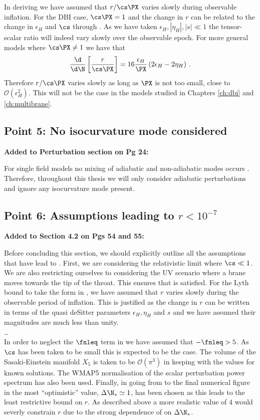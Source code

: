 In deriving  we have assumed that $r/\cs \PX$ varies slowly during
observable inflation. For the DBI case, $\cs \PX = 1$ and the change in $r$ can be related to the
change in $\epsilon_H$ and $\cs$ through . As we have taken $\epsilon_H,
|\eta_H|,|s|\ll 1$ the tensor-scalar ratio will indeed vary slowly over the observable epoch.
% 
For more general models where $\cs \PX \ne 1$ we have that
% 
\begin{equation}
 \frac{\d }{\d \N}\left[ \frac{r}{\cs \PX}\right] = 16\frac{\epsilon_H}{\PX}\left( 2\epsilon_H
-2\eta_H\right)\,.
\end{equation}
% 
Therefore $r/\cs\PX$ varies slowly as long as $\PX$ is not too small, \iec close to
$\mathcal{O}(\epsilon_H^2)$. This will not be the case in the models studied in Chapters
\ref{ch:dbi} and \ref{ch:multibrane}.

\subsection{Point 5: No isocurvature mode considered}
\textbf{Added to Perturbation section on Pg 24:}

For single field models no mixing
of adiabatic and non-adiabatic modes occurs \cite{Weinberg200804}. Therefore, throughout this
thesis we will only consider adiabatic perturbations and ignore any isocurvature mode present.

\subsection{Point 6: Assumptions leading to $r<10^{-7}$}
\textbf{Added to Section 4.2 on Pgs 54 and 55:}


Before concluding this section, we should explicitly outline all the assumptions that have lead to
. First, we are considering the relativistic limit where $\cs\ll1$. We are
also restricting ourselves to considering the UV scenario where a brane moves towards the tip of
the throat. This ensures that  is satisfied. For the Lyth bound to take the
form in , we have assumed that $r$ varies slowly during the observable
period of inflation. This is justified as the change in $r$ can be written in terms of the
quasi deSitter parameters $\epsilon_H, \eta_H$ and $s$ and we have assumed their magnitudes are
much less than unity.
\\
\ldots
\\
In order to neglect the $\fnleq$ term in  we have assumed that $-\fnleq>5$. As
$\cs$ has been taken to be small this is expected to be the case. The volume of the Sasaki-Einstein
manifold $X_5$ is taken to be $\mathcal{O}(\pi^3)$ in keeping with the values for known solutions.
The WMAP5 normalisation of the scalar perturbation power spectrum has also been used. Finally, in
going from  to the final numerical figure in  the most
``optimistic'' value, $\Delta \N_*\simeq 1$, has been chosen as this leads to the least
restrictive bound on $r$.  As described above a more realistic value of $4$ would severly
constrain $r$ due to the strong dependence of  on $\Delta\N_*$.